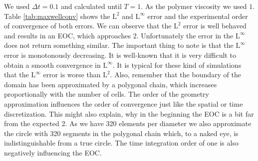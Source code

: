 \documentclass[12pt,a4paper,twoside, open=right]{scrreprt}
\theoremstyle{definition}
\theoremstyle{plain}
\begin{document}
We used $\Delta t = 0.1$ and calculated until $T=1$. As the polymer viscosity we used $1$. Table \ref{tab:maxwellconv} shows the $\mathrm{L}^2$ and $\mathrm{L}^\infty$ error and the experimental order of convergence of both errors. We can observe that the $\mathrm{L}^2$ error is well behaved and results in an EOC, which approaches 2. Unfortunately the error in the $\mathrm{L}^\infty$ does not return something similar. The important thing to note is that the $\mathrm{L}^\infty$ error is monotonously decreasing. It is well-known that it is very difficult to obtain a smooth convergence in $\mathrm{L}^\infty$. It is typical for these kind of simulations that the $\mathrm{L}^\infty$ error is worse than $\mathrm{L}^2$. Also, remember that the boundary of the domain has been approximated by a polygonal chain, which increases proportionally with the number of cells. The order of the geometry approximation influences the order of convergence just like the spatial or time discretization. This might also explain, why in the beginning the EOC is a bit far from the expected 2. As we have 320 elements per diameter we also approximate the circle with 320 segments in the polygonal chain which, to a naked eye, is indistinguishable from a true circle. The time integration order of one is also negatively influencing the EOC. 
\end{document}
